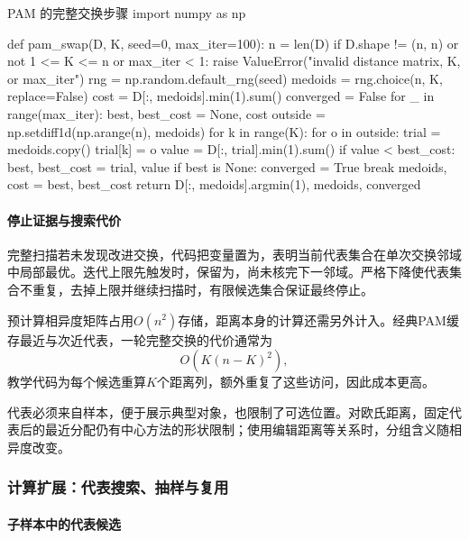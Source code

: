 \begin{codeblock}[language=Python,label={code:clustering-pam}]{PAM 的完整交换步骤}
import numpy as np

def pam_swap(D, K, seed=0, max_iter=100):
    n = len(D)
    if D.shape != (n, n) or not 1 <= K <= n or max_iter < 1:
        raise ValueError("invalid distance matrix, K, or max_iter")
    rng = np.random.default_rng(seed)
    medoids = rng.choice(n, K, replace=False)
    cost = D[:, medoids].min(1).sum()
    converged = False
    for _ in range(max_iter):
        best, best_cost = None, cost
        outside = np.setdiff1d(np.arange(n), medoids)
        for k in range(K):
            for o in outside:
                trial = medoids.copy()
                trial[k] = o
                value = D[:, trial].min(1).sum()
                if value < best_cost:
                    best, best_cost = trial, value
        if best is None:
            converged = True
            break
        medoids, cost = best, best_cost
    return D[:, medoids].argmin(1), medoids, converged
\end{codeblock}

\paragraph{停止证据与搜索代价}

完整扫描若未发现改进交换，代码把变量置为，表明当前代表集合在单次交换邻域中局部最优。迭代上限先触发时，保留为，尚未核完下一邻域。严格下降使代表集合不重复，去掉上限并继续扫描时，有限候选集合保证最终停止。

预计算相异度矩阵占用$O(n^2)$存储，距离本身的计算还需另外计入。经典PAM缓存最近与次近代表，一轮完整交换的代价通常为
\[
  O\!\left(K(n-K)^2\right),
\]
教学代码为每个候选重算$K$个距离列，额外重复了这些访问，因此成本更高。

代表必须来自样本，便于展示典型对象，也限制了可选位置。对欧氏距离，固定代表后的最近分配仍有中心方法的形状限制；使用编辑距离等关系时，分组含义随相异度改变。

\subsubsection{计算扩展：代表搜索、抽样与复用}

\paragraph{子样本中的代表候选}

